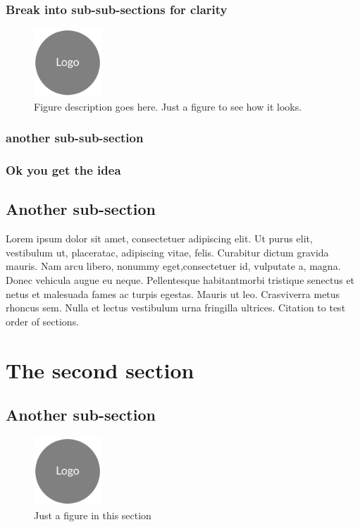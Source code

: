 \documentclass[a4paper, oneside, 11pt]{book}
\begin{document}
      \subsubsection{Break into sub-sub-sections for clarity}
      \lipsum[1]
			\begin{figure}
			  \centering
				\includegraphics[width=1in, keepaspectratio]{logo.png}
				\caption[Appears in figure list]{\small Figure description goes here. Just a figure to see how it looks.}
			\end{figure}

      \subsubsection{another sub-sub-section}
      \lipsum[1-2]

      \subsubsection{Ok you get the idea}
      \lipsum[1]

    \subsection{Another sub-section}
    Lorem ipsum dolor sit amet, consectetuer adipiscing elit. Ut purus elit, vestibulum ut, placeratac, adipiscing vitae, felis. Curabitur dictum gravida mauris. Nam arcu libero, nonummy eget,consectetuer id, vulputate a, magna. Donec vehicula augue eu neque. Pellentesque habitantmorbi tristique senectus et netus et malesuada fames ac turpis egestas. Mauris ut leo. Crasviverra metus rhoncus sem. Nulla et lectus vestibulum urna fringilla ultrices.
    Citation to test order of sections.

\section{The second section}

\subsection{Another sub-section}
\lipsum[1-3]
\begin{figure}
  \centering
	\includegraphics[width=1in, keepaspectratio]{logo.png}
	\caption[Short Caption]{\small Just a figure in this section}
\end{figure}
\lipsum[1]
\end{document}
